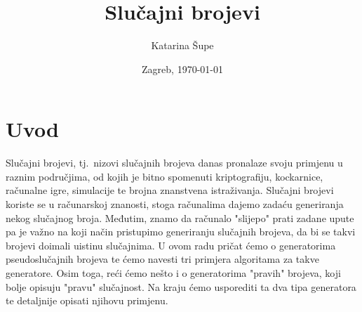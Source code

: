 \documentclass[10pt]{scrartcl}
\title{Slučajni brojevi}
\author{Katarina Šupe}
\date{Zagreb, \today}
\begin{document}
\maketitle
\tableofcontents
\pagebreak[4]
\section{Uvod}
Slučajni brojevi, tj.\ nizovi slučajnih brojeva danas pronalaze svoju primjenu u raznim područjima, od kojih je bitno spomenuti kriptografiju, kockarnice, računalne igre, simulacije te brojna znan\-stve\-na istraživanja. Slučajni brojevi koriste se u računarskoj znanosti, stoga ra\-ču\-na\-li\-ma dajemo zadaću generiranja nekog slučajnog broja. Međutim, znamo da računalo "slijepo" prati zadane upute pa je važno na koji način pristupimo generiranju slučajnih brojeva, da bi se takvi brojevi doimali uistinu slučajnima. U ovom radu pričat ćemo o generatorima pseudoslučajnih brojeva te ćemo navesti tri primjera algoritama za takve generatore. Osim toga, reći ćemo nešto i o generatorima "pravih" brojeva, koji bolje opisuju "pravu" slučajnost. Na kraju ćemo usporediti ta dva tipa generatora te detaljnije opisati njihovu primjenu. 
\end{document}
